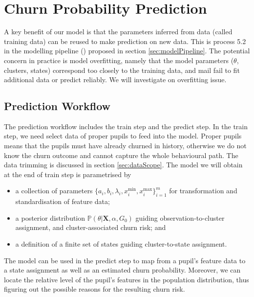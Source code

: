 \vspace*{-0.5cm}
\section{Churn Probability Prediction}
\label{sec:prediction}

A key benefit of our model is that the parameters inferred from data (called training data) can be reused to make prediction on new data. This is process 5.2 in the modelling pipeline () proposed in section \ref{sec:modelPipeline}. The potential concern in practice is model overfitting, namely that the model parameters ($\theta$, clusters, states) correspond too closely to the training data, and mail fail to fit additional data or predict reliably. We will investigate on overfitting issue.

\subsection{Prediction Workflow}



The prediction workflow includes the train step and the predict step. In the train step, we need select data of proper pupils to feed into the model. Proper pupils means that the pupils must have already churned in history, otherwise we do not know the churn outcome and cannot capture the whole behavioural path. The data trimming is discussed in section \ref{sec:dataScope}. The model we will obtain at the end of train step is parametrised by
\begin{itemize}
\item a collection of parameters $\{ a_i, b_i, \lambda_i, x_i^\text{min}, x_i^\text{max}\}_{i=1}^m$ for transformation and standardisation of feature data;
\item a posterior distribution $\mathbb{P} (\theta | \mathbf{X}, \alpha, G_0)$ guiding observation-to-cluster assignment, and cluster-associated churn risk; and
\item a definition of a finite set of states guiding cluster-to-state assignment.
\end{itemize}
The model can be used in the predict step to map from a pupil's feature data to a state assignment as well as an estimated churn probability. Moreover, we can locate the relative level of the pupil's features in the population distribution, thus figuring out the possible reasons for the resulting churn risk.

